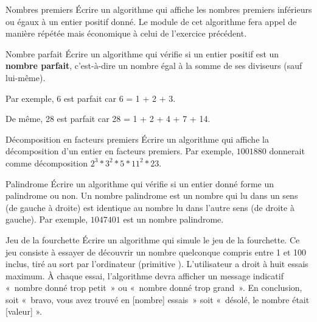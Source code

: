 \bigskip
\begin{Exercice}{Nombres premiers}
	Écrire un algorithme qui affiche les nombres premiers inférieurs ou
	égaux à un entier positif donné. Le module de cet algorithme fera appel
	de manière répétée mais économique à celui de l’exercice précédent.
\end{Exercice}

\begin{Exercice}{Nombre parfait}
	Écrire un algorithme qui vérifie si un entier positif est un
	\textbf{nombre parfait}, c’est-à-dire un nombre égal à la somme de ses
	diviseurs (sauf lui-même). 
	
	Par exemple, 6 est parfait car 6 = 1 + 2 + 3. 
	
	De même, 28 est parfait car 28 = 1 + 2 + 4 + 7 + 14.
\end{Exercice}

\begin{Exercice}{Décomposition en facteurs premiers}
	Écrire un algorithme qui affiche la décomposition 
	d’un entier en facteurs premiers. 
	Par exemple, $1001880$ donnerait comme décomposition
	$2^3 * 3^2 * 5 * 11^2 * 23$.
\end{Exercice}

\begin{Exercice}{Palindrome}
	Écrire un algorithme qui vérifie si un entier donné 
	forme un palindrome ou non. 
	Un nombre palindrome est un nombre qui lu dans un sens 
	(de gauche à droite) est identique au nombre lu dans l’autre sens 
	(de droite à gauche). 
	Par exemple, $1047401$ est un nombre palindrome.
\end{Exercice}

\begin{Exercice}{Jeu de la fourchette}
	Écrire un algorithme qui simule le jeu de la
	fourchette. Ce jeu consiste à essayer de découvrir un nombre quelconque
	compris entre 1 et 100 inclus, tiré au sort par l’ordinateur (primitive
	). L’utilisateur a droit à huit essais
	maximum. À chaque essai, l’algorithme devra afficher un message
	indicatif «~nombre donné trop petit~» ou «~nombre donné trop grand~».
	En conclusion, soit «~bravo, vous avez trouvé en [nombre] essais~» soit
	«~désolé, le nombre était [valeur] ».
\end{Exercice}

